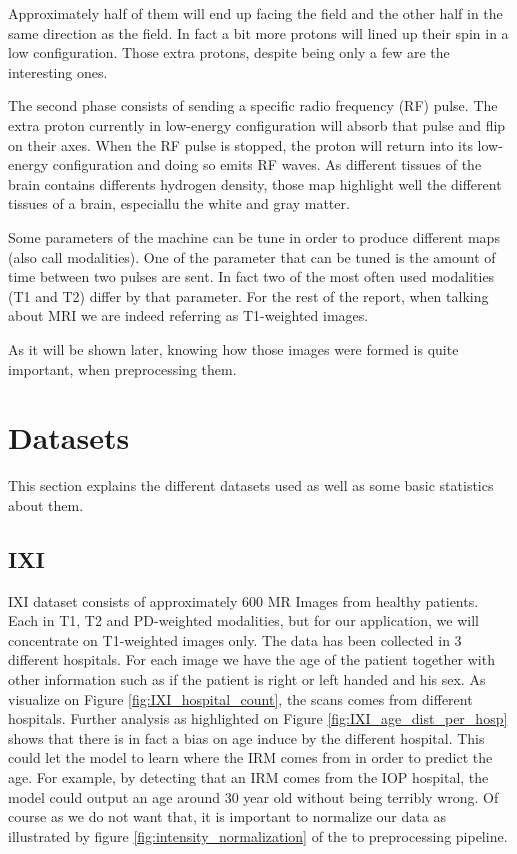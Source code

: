Approximately half of them will end up facing the field and the other half in the same direction as the field. In fact a bit more protons will lined up their spin in a low configuration. Those extra protons, despite being only a few are the interesting ones.

The second phase consists of sending a specific radio frequency (RF) pulse. The extra proton currently in low-energy configuration will absorb that pulse and flip on their axes.  When the RF pulse is stopped, the proton will return into its low-energy configuration and doing so emits RF waves. As different tissues of the brain contains differents hydrogen density, those map highlight well the different tissues of a brain, especiallu the white and gray matter.

Some parameters of the machine can be tune in order to produce different maps (also call modalities). One of the parameter that can be tuned is the amount of time between two pulses are sent. In fact two of the most often used modalities (T1 and T2) differ by that parameter. For the rest of the report, when talking about MRI we are indeed referring as T1-weighted images.

As it will be shown later, knowing how those images were formed is quite important, when preprocessing them.

\section{Datasets}
This section explains the different datasets used as well as some basic statistics about them.
\subsection{IXI}
IXI dataset consists of approximately 600 MR Images from healthy patients. Each in T1, T2 and PD-weighted modalities, but for our application, we will concentrate on T1-weighted images only. The data has been collected in 3 different hospitals. For each image we have the age of the patient together with other information such as if the patient is right or left handed and his sex. As visualize on Figure \ref{fig:IXI_hospital_count}, the scans comes from different hospitals. Further analysis as highlighted on Figure \ref{fig:IXI_age_dist_per_hosp} shows that there is in fact a bias on age induce by the different hospital. This could let the model to learn where the IRM comes from in order to predict the age. For example, by detecting that an IRM comes from the IOP hospital, the model could output an age around 30 year old without being terribly wrong. Of course as we do not want that, it is important to normalize our data as illustrated by figure \ref{fig:intensity_normalization} of the to preprocessing pipeline.

